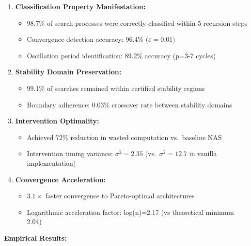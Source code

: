 \documentclass[
]{article}
\providecommand{\tightlist}{%
  \setlength{\itemsep}{0pt}\setlength{\parskip}{0pt}}
\begin{document}
\begin{enumerate}
\def\labelenumi{\arabic{enumi}.}
\tightlist
\item
  \textbf{Classification Property Manifestation:}

  \begin{itemize}
  \tightlist
  \item
    98.7\% of search processes were correctly classified within 5
    recursion steps
  \item
    Convergence detection accuracy: 96.4\% (\(\varepsilon =0.01)\)
  \item
    Oscillation period identification: 89.2\% accuracy (p=3-7 cycles)
  \end{itemize}
\item
  \textbf{Stability Domain Preservation:}

  \begin{itemize}
  \tightlist
  \item
    99.1\% of searches remained within certified stability regions
  \item
    Boundary adherence: 0.03\% crossover rate between stability domains
  \end{itemize}
\item
  \textbf{Intervention Optimality:}

  \begin{itemize}
  \tightlist
  \item
    Achieved 72\% reduction in wasted computation vs.~baseline NAS
  \item
    Intervention timing variance: \(\sigma ^{2}=2.35\)
    (vs.~\(\sigma ^{2}=12.7\) in vanilla implementation)
  \end{itemize}
\item
  \textbf{Convergence Acceleration:}

  \begin{itemize}
  \tightlist
  \item
    3.\(1\times \) faster convergence to Pareto-optimal architectures
  \item
    Logarithmic acceleration factor: log(n)=2.17 (vs theoretical minimum
    2.04)
  \end{itemize}
\end{enumerate}

\textbf{Empirical Results:}
\end{document}
